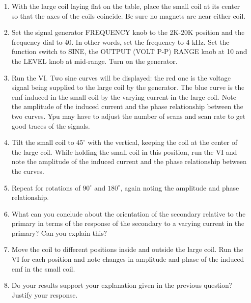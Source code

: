 \begin{enumerate}
\item With the large coil laying flat on the table, place the small coil
at its center so that the axes of the coils coincide. Be sure no magnets
are near either coil.
\item Set the signal generator FREQUENCY knob to the 2K-20K position and
the frequency dial to 40. In other words, set the frequency to 4 kHz.
Set the function switch to SINE, the OUTPUT (VOLT P-P) RANGE knob
at 10 and the LEVEL knob at mid-range. Turn on the generator.
\item Run the VI. Two sine curves will be displayed: the red one is the
voltage signal being supplied to the large coil by the generator.
The blue curve is the emf induced in the small coil by the varying
current in the large coil. Note the amplitude of the induced current
and the phase relationship between the two curves. Ypu may have to
adjust the number of scans and scan rate to get good traces of the
signals.
\item Tilt the small coil to $45^\circ$ with the vertical, keeping the coil
at the center of the large coil. While holding the small coil in this
position, run the VI and note the amplitude of the induced current
and the phase relationship between the curves.
\item Repeat for rotations of $90^\circ$ and $180^\circ$, again noting the
amplitude and phase relationship. 
\item What can you conclude about the orientation of the secondary relative
to the primary in terms of the response of the secondary to a varying
current in the primary? Can you explain this? \vspace{15mm}

\item Move the coil to different positions inside and outside the large
coil. Run the VI for each position and note changes in amplitude and
phase of the induced emf in the small coil. \vspace{15mm}

\item Do your results support your explanation given in the previous question?
Justify your response.\vspace{15mm}
\end{enumerate}

